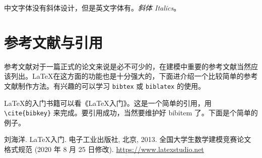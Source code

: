 \documentclass{cumcmthesis}
\begin{document}
中文字体没有斜体设计，但是英文字体有。\textit{斜体 Italics}。

\section{参考文献与引用}

参考文献对于一篇正式的论文来说是必不可少的，在建模中重要的参考文献当然应该列出。\LaTeX{}在这方面的功能也是十分强大的，下面进介绍一个比较简单的参考文献制作方法。有兴趣的可以学习 \verb|bibtex| 或 \verb|biblatex| 的使用。

\LaTeX{}的入门书籍可以看《\LaTeX{}入门》\cite{liuhaiyang2013latex}。这是一个简单的引用，用 \verb|\cite{bibkey}| 来完成。要引用成功，当然要维护好 bibitem 了。下面是个简单的例子。

 

\begin{thebibliography}{9}%
    刘海洋.
    \newblock \LaTeX {}入门\allowbreak[J].
    \newblock 电子工业出版社, 北京, 2013.
    全国大学生数学建模竞赛论文格式规范 (2020 年 8 月 25 日修改).
     \url{https://www.latexstudio.net}
\end{thebibliography}
\end{document}
